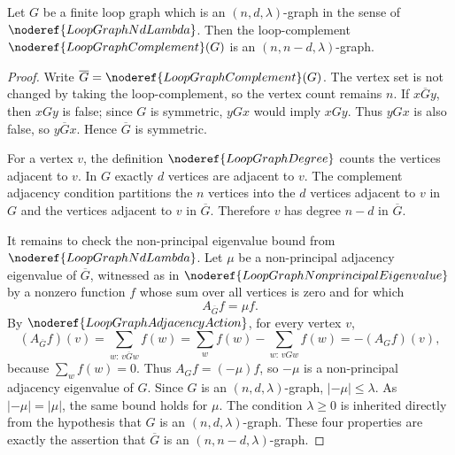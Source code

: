 \begin{helper}
Let \(G\) be a finite loop graph which is an \((n,d,\lambda)\)-graph in the
sense of \(\noderef{LoopGraphNdLambda}\).  Then the loop-complement
\(\noderef{LoopGraphComplement}(G)\) is an \((n,n-d,\lambda)\)-graph.
\end{helper}
\begin{proof}
Write \(\overline G=\noderef{LoopGraphComplement}(G)\).  The vertex set is not
changed by taking the loop-complement, so the vertex count remains \(n\).  If
\(x\overline G y\), then \(xGy\) is false; since \(G\) is symmetric, \(yGx\)
would imply \(xGy\).  Thus \(yGx\) is also false, so \(y\overline G x\).
Hence \(\overline G\) is symmetric.

For a vertex \(v\), the definition \(\noderef{LoopGraphDegree}\) counts the
vertices adjacent to \(v\).  In \(G\) exactly \(d\) vertices are adjacent to
\(v\).  The complement adjacency condition partitions the \(n\) vertices into
the \(d\) vertices adjacent to \(v\) in \(G\) and the vertices adjacent to
\(v\) in \(\overline G\).  Therefore \(v\) has degree \(n-d\) in
\(\overline G\).

It remains to check the non-principal eigenvalue bound from
\(\noderef{LoopGraphNdLambda}\).  Let \(\mu\) be a non-principal adjacency
eigenvalue of \(\overline G\), witnessed as in
\(\noderef{LoopGraphNonprincipalEigenvalue}\) by a nonzero function \(f\) whose
sum over all vertices is zero and for which
\[
  A_{\overline G} f=\mu f.
\]
By \(\noderef{LoopGraphAdjacencyAction}\), for every vertex \(v\),
\[
  (A_{\overline G}f)(v)
  =\sum_{w:\,v\overline G w} f(w)
  =\sum_w f(w)-\sum_{w:\,vGw} f(w)
  =-(A_Gf)(v),
\]
because \(\sum_w f(w)=0\).  Thus \(A_Gf=(-\mu)f\), so \(-\mu\) is a
non-principal adjacency eigenvalue of \(G\).  Since \(G\) is an
\((n,d,\lambda)\)-graph, \(|-\mu|\le\lambda\).  As \(|-\mu|=|\mu|\), the same
bound holds for \(\mu\).  The condition \(\lambda\ge0\) is inherited directly
from the hypothesis that \(G\) is an \((n,d,\lambda)\)-graph.  These four
properties are exactly the assertion that \(\overline G\) is an
\((n,n-d,\lambda)\)-graph.
\end{proof}
